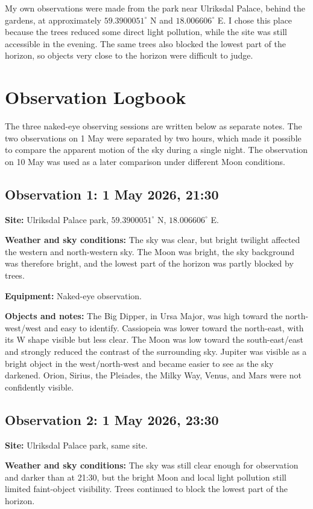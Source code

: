 \documentclass[a4paper,11pt]{article}
\begin{document}
My own observations were made from the park near Ulriksdal Palace, behind the gardens, at approximately $59.3900051^\circ$ N and $18.006606^\circ$ E. I chose this place because the trees reduced some direct light pollution, while the site was still accessible in the evening. The same trees also blocked the lowest part of the horizon, so objects very close to the horizon were difficult to judge.

\section{Observation Logbook}
\label{sec:logbook}

The three naked-eye observing sessions are written below as separate notes. The two observations on 1 May were separated by two hours, which made it possible to compare the apparent motion of the sky during a single night. The observation on 10 May was used as a later comparison under different Moon conditions.

\subsection*{Observation 1: 1 May 2026, 21:30}
\textbf{Site:} Ulriksdal Palace park, $59.3900051^\circ$ N, $18.006606^\circ$ E.

\textbf{Weather and sky conditions:} The sky was clear, but bright twilight affected the western and north-western sky. The Moon was bright, the sky background was therefore bright, and the lowest part of the horizon was partly blocked by trees.

\textbf{Equipment:} Naked-eye observation.

\textbf{Objects and notes:} The Big Dipper, in Ursa Major, was high toward the north-west/west and easy to identify. Cassiopeia was lower toward the north-east, with its W shape visible but less clear. The Moon was low toward the south-east/east and strongly reduced the contrast of the surrounding sky. Jupiter was visible as a bright object in the west/north-west and became easier to see as the sky darkened. Orion, Sirius, the Pleiades, the Milky Way, Venus, and Mars were not confidently visible.

\subsection*{Observation 2: 1 May 2026, 23:30}
\textbf{Site:} Ulriksdal Palace park, same site.

\textbf{Weather and sky conditions:} The sky was still clear enough for observation and darker than at 21:30, but the bright Moon and local light pollution still limited faint-object visibility. Trees continued to block the lowest part of the horizon.
\end{document}
